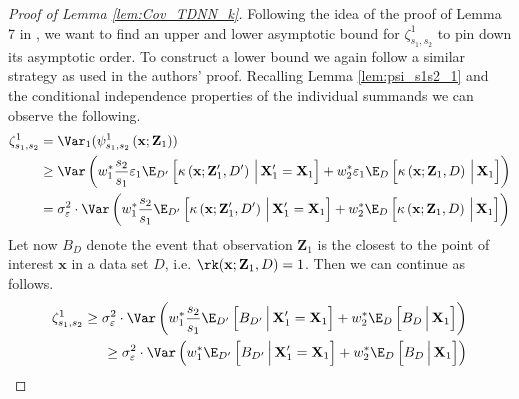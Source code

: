 \begin{proof}[Proof of Lemma \ref{lem:Cov_TDNN_k}]
	Following the idea of the proof of Lemma 7 in \citet{demirkaya_optimal_2024}, we want to find an upper and lower asymptotic bound for $\zeta_{s_1, s_2}^{1}$ to pin down its asymptotic order.
	To construct a lower bound we again follow a similar strategy as used in the authors' proof.
	Recalling Lemma \ref{lem:psi_s1s2_1} and the conditional independence properties of the individual summands we can observe the following.
	\begin{equation}
		\begin{aligned}
			\zeta_{s_1, s_2}^{1}
			 & = \Var_{1}(\psi_{s_1, s_2}^{1}\left(\mathbf{x}; \mathbf{Z}_1\right))                                                                                                               \\
			 & \geq \Var\left(w_{1}^{*}\frac{s_2}{s_1}\varepsilon_1 \E_{D'}\left[\kappa\left(\mathbf{x}; \mathbf{Z}_1^{\prime}, D'\right)\, \Big| \, \mathbf{X}_1^{\prime} = \mathbf{X}_1 \right]
			+ w_{2}^{*}\varepsilon_1 \E_D\left[\kappa\left(\mathbf{x}; \mathbf{Z}_1, D\right)\, \Big| \, \mathbf{X}_1\right]\right)                                                               \\
			 & = \sigma_{\varepsilon}^{2}\cdot
			\Var\left(w_{1}^{*}\frac{s_2}{s_1}\E_{D'}\left[\kappa\left(\mathbf{x}; \mathbf{Z}_1^{\prime}, D'\right)\, \Big| \, \mathbf{X}_1^{\prime} = \mathbf{X}_1 \right]
			+ w_{2}^{*}\E_D\left[\kappa\left(\mathbf{x}; \mathbf{Z}_1, D\right)\, \Big| \, \mathbf{X}_1\right]\right)                                                                             \\
		\end{aligned}
	\end{equation}
	Let now $B_D$ denote the event that observation $\mathbf{Z}_1$ is the closest to the point of interest $\mathbf{x}$ in a data set $D$, i.e. $\rk(\mathbf{x}; \mathbf{Z}_1, D) = 1$.
	Then we can continue as follows.
	\begin{equation}
		\begin{aligned}
			\zeta_{s_1, s_2}^{1}
			\geq \sigma_{\varepsilon}^{2}\cdot \Var\left(w_{1}^{*}\frac{s_2}{s_1}\E_{D'}\left[B_{D'}\, \Big| \, \mathbf{X}_1^{\prime} = \mathbf{X}_1 \right]
			+ w_{2}^{*}\E_D\left[B_D\, \Big| \, \mathbf{X}_1\right]\right)\\
			\geq \sigma_{\varepsilon}^{2}\cdot \Var\left(w_{1}^{*}\E_{D'}\left[B_{D'}\, \Big| \, \mathbf{X}_1^{\prime} = \mathbf{X}_1 \right]
			+ w_{2}^{*}\E_D\left[B_D\, \Big| \, \mathbf{X}_1\right]\right)

\end{aligned}
\end{equation}
\end{proof}
